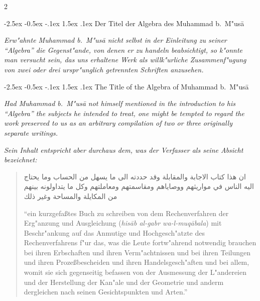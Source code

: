 \documentclass[10pt,a4paper]{article}
\makeatletter
\newcommand{\RL}[1]{\beginR#1\endR}
\newcommand{\arblock}[1]{{\arabicfont\large\RL{#1}}}
\newcommand{\enquote}[1]{``#1''}
\renewcommand{\section}{\@startsection{section}{1}{\z@}%
  {-2.5ex \@plus -0.5ex \@minus -.1ex}%
  {1.5ex \@plus .1ex}%
  {\normalfont\large\bfseries\color{sectioncolor}}}
\makeatother
\begin{document}
\clearpage

\begin{paracol}{2}

\section{Der Titel der Algebra des Muhammad b.\ M"us\=a}

\textit{Erw"ahnte Muhammad b.\ M"us\=a nicht selbst in der Einleitung zu seiner \enquote{Algebra} die Gegenst"ande, von denen er zu handeln beabsichtigt, so k"onnte man versucht sein, das uns erhaltene Werk als willk"urliche Zusammenf"ugung von zwei oder drei urspr"unglich getrennten Schriften anzusehen.}

\switchcolumn

\section{The Title of the Algebra of Muhammad b.\ M"us\=a}

\textit{Had Muhammad b.\ M"us\=a not himself mentioned in the introduction to his \enquote{Algebra} the subjects he intended to treat, one might be tempted to regard the work preserved to us as an arbitrary compilation of two or three originally separate writings.}

\switchcolumn*

\textit{Sein Inhalt entspricht aber durchaus dem, was der Verfasser als seine Absicht bezeichnet:}

\begin{quote}
\arblock{ان هذا كتاب الاجابة والمقابلة وقد حددته الى ما يسهل من الحساب وما يحتاج اليه الناس في مواريثهم ووصاياهم ومقاسمتهم ومعاملتهم وكل ما يتداولونه بينهم من المكايلة والمساحة وغير ذلك}

\enquote{ein kurzgefa\ss{}tes Buch zu schreiben von dem Rechenverfahren der Erg"anzung und Ausgleichung (\textit{his\=ab al-gabr wa-l-muq\=abala}) mit Beschr"ankung auf das Anmutige und Hochgesch"atzte des Rechenverfahrens f"ur das, was die Leute fortw"ahrend notwendig brauchen bei ihren Erbschaften und ihren Verm"achtnissen und bei ihren Teilungen und ihren Proze\ss{}bescheiden und ihren Handelsgesch"aften und bei allem, womit sie sich gegenseitig befassen von der Ausmessung der L"andereien und der Herstellung der Kan"ale und der Geometrie und anderm dergleichen nach seinen Gesichtspunkten und Arten.}
\end{quote}


\end{paracol}
\end{document}
